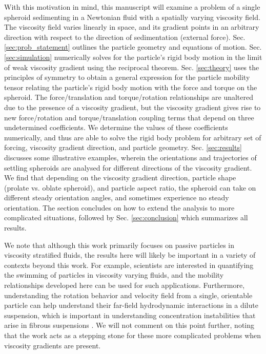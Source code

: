 \documentclass{jfm}
\begin{document}
With this motivation in mind, this manuscript will examine a problem of a single spheroid sedimenting in a Newtonian fluid with a spatially varying viscosity field.  The viscosity field varies linearly in space, and its gradient points in an arbitrary direction with respect to the direction of sedimentation (external force). Sec. \ref{sec:prob_statement} outlines the particle geometry and equations of motion.  Sec. \ref{sec:simulation} numerically solves for the particle’s rigid body motion in the limit of weak viscosity gradient using the reciprocal theorem.  Sec. \ref{sec:theory} uses the principles of symmetry to obtain a general expression for the particle mobility tensor relating the particle’s rigid body motion with the force and torque on the spheroid.  The force/translation and torque/rotation relationships are unaltered due to the presence of a viscosity gradient, but the viscosity gradient gives rise to new force/rotation and torque/translation coupling terms that depend on three undetermined coefficients. We determine the values of these coefficients numerically, and thus are able to solve the rigid body problem for arbitrary set of forcing, viscosity gradient direction, and particle geometry. Sec. \ref{sec:results} discusses some illustrative examples, wherein the orientations and trajectories of settling spheroids are analysed for different directions of the viscosity gradient.  We find that depending on the viscosity gradient direction, particle shape (prolate vs. oblate spheroid), and particle aspect ratio, the spheroid can take on different steady orientation angles, and sometimes experience no steady orientation.  The section concludes on how to extend the analysis to more complicated situations, followed by Sec. \ref{sec:conclusion} which summarizes all results.


We note that although this work primarily focuses on passive particles in viscosity stratified fluids, the results here will likely be important in a variety of contexts beyond this work.  For example, scientists are interested in quantifying the swimming of particles in viscosity varying fluids, and the mobility relationships developed here can be used for such applications.  Furthermore, understanding the rotation behavior and velocity field from a single, orientable particle can help understand their far-field hydrodynamic interactions in a dilute suspension, which is important in understanding concentration instabilities that arise in fibrous suspensions  \citep{Koch_Shaqfeh_JFM_1989, Herzhaft_experimental_1999, Bulter_Shaqfeh_Simulation_2002,Kuusela_Simulation_2003, Koch_Shaqfeh_Stable,Nicolai_1998_POF, Shin_Koch_Subramanian_1,Shin_Koch_Subramanian_2, Ramanathan_Saintillan_2012}.  We will not comment on this point further, noting that the work acts as a stepping stone for these more complicated problems when viscosity gradients are present.
\end{document}
